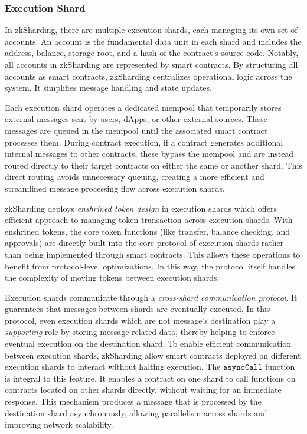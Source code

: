 \subsubsection{Execution Shard}
\label{sec:executionshards}
In zkSharding, there are multiple execution shards, each managing its own
set of accounts. An account is the fundamental data unit in each shard and
includes the address, balance, storage root, and a hash of the contract’s
source code. Notably, all accounts in zkSharding are represented by smart
contracts. By structuring all accounts as smart contracts, zkSharding
centralizes operational logic across the system. It simplifies message
handling and state updates.

Each execution shard operates a dedicated mempool that temporarily stores
external messages sent by users, dApps, or other external sources. These
messages are queued in the mempool until the associated smart contract
processes them.
During contract execution, if a contract generates additional internal
messages to other contracts, these bypass the mempool and are instead
routed directly to their target contracts on either the same or another
shard. This direct routing avoids unnecessary queuing, creating a more
efficient and streamlined message processing flow across execution shards.

zkSharding deploys \emph{enshrined token design} \cite{tokenNil} in
execution shards which offers efficient approach to managing token
transaction across execution shards. With enshrined tokens, the core token
functions (like transfer, balance checking, and approvals) are directly
built into the core protocol of execution shards rather than being
implemented through smart contracts. This allows these operations to
benefit from protocol-level optimizations. In this way, the protocol
itself handles the complexity of moving tokens between execution shards.

Execution shards communicate through a
\emph{cross-shard communication protocol}. It guarantees that
messages between shards are
eventually executed. In this protocol, even execution shards which are not
message's
destination play a \textit{supporting} role by storing message-related
data, thereby helping to enforce eventual
execution on the destination shard. 
To enable efficient communication between execution shards, zkSharding
allow smart contracts deployed on different execution shards to interact
without halting execution. The $\mathtt{asyncCall}$ function
\cite{asyncNil} is integral to this feature. It enables a contract on one
shard to call functions on contracts located on other shards directly,
without waiting for an immediate response. This mechanism produces a
message that is processed by the destination shard asynchronously,
allowing parallelism across shards and improving network scalability.

